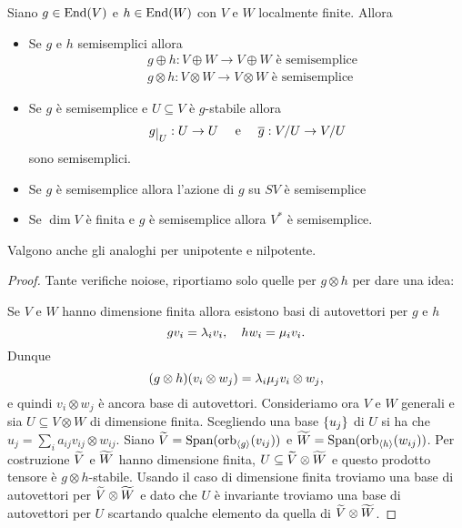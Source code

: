 \begin{lemma}\label{LmPassaggioSemisempliceUnipotenteNilpotenteAdOperazioniVettoriali}
Siano $g\in\operatorname{End}(V)$ e $h\in\operatorname{End}(W)$ con $V$ e $W$ localmente finite. Allora
\begin{itemize}
    \item Se $g$ e $h$ semisemplici allora
    \begin{align*}
    &g\oplus h:V\oplus W\to V\oplus W\text{ \`e semisemplice}\\
    &g\otimes h:V\otimes W\to V\otimes W\text{ \`e semisemplice}
    \end{align*}
    \item Se $g$ \`e semisemplice e $U\subseteq V$ \`e $g$-stabile allora 
    \[g\res U:U\to U\quad\text{ e }\quad \ol g:V/U\to V/U\] 
    sono semisemplici.
    \item Se $g$ \`e semisemplice allora l'azione di $g$ su $SV$ \`e semisemplice
    \item Se $\dim V$ \`e finita e $g$ \`e semisemplice allora $V^\ast$ \`e semisemplice.
\end{itemize}
Valgono anche gli analoghi per unipotente e nilpotente.
\end{lemma}
\begin{proof}
Tante verifiche noiose, riportiamo solo quelle per $g\otimes h$ per dare una idea:

Se $V$ e $W$ hanno dimensione finita allora esistono basi di autovettori per $g$ e $h$
\[gv_i=\lambda_iv_i,\quad hw_i=\mu_iv_i.\]
Dunque
\[(g\otimes h)(v_i\otimes w_j)=\lambda_i\mu_j v_i\otimes w_j,\]
e quindi $v_i\otimes w_j$ \`e ancora base di autovettori.
Consideriamo ora $V$ e $W$ generali e sia $U\subseteq V\otimes W$ di dimensione finita. Scegliendo una base $\left\{ u_j\right\}$ di $U$ si ha che $u_j=\sum_{i} a_{ij}v_{ij}\otimes w_{ij}$. Siano $\widetilde{V}=\operatorname{Span}(\operatorname{orb}_{\left\langle {g}\right\rangle}(v_{ij}))$ e $\widetilde{W}=\operatorname{Span}(\operatorname{orb}_{\left\langle {h}\right\rangle}(w_{ij}))$. Per costruzione $\widetilde{V}$ e $\widetilde{W}$ hanno dimensione finita, $U\subseteq \widetilde{V}\otimes \widetilde{W}$ e questo prodotto tensore \`e $g\otimes h$-stabile. Usando il caso di dimensione finita troviamo una base di autovettori per $\widetilde{V}\otimes \widetilde{W}$ e dato che $U$ \`e invariante troviamo una base di autovettori per $U$ scartando qualche elemento da quella di $\widetilde{V}\otimes \widetilde{W}$. 
\end{proof}


